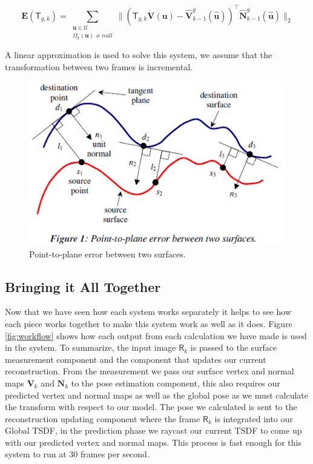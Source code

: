 \documentclass[10pt, twocolumn]{article}
\begin{document}
\begin{equation}
\mathbf{E}(\mathsf{T}_{g,k}) = 
\sum_{\substack{
   \mathbf{u} \in \mathcal{U} \\
   \Omega_{k}(\mathbf{u}) \neq null
  }}
  \| ( \mathsf{T}_{g,k} \mathbf{\dot{V}} (\mathbf{u}) - \mathbf{\hat{V}}^{g}_{k-1} (\mathbf{\hat{u}}))^{\top} \mathbf{\hat{N}}^{g}_{k-1} (\mathbf{\hat{u}}) \|_{2}
\end{equation}


A linear approximation is used to solve this system, we assume that the transformation between two frames is incremental.

\begin{figure}
  \centering
  \includegraphics[width=1.0\linewidth]{pointplane}
  \caption{Point-to-plane error between two surfaces.}
  \label{fig:pointplane}
\end{figure}

\subsection{Bringing it All Together}
Now that we have seen how each system works separately it helps to see how each piece works together to make this system work as well as it does. Figure \ref{fig:workflow} shows how each output from each calculation we have made is used in the system. To summarize, the input image $\mathsf{R}_k$ is passed to the surface measurement component and the component that updates our current reconstruction. From the measurement we pass our surface vertex and normal maps $\mathbf{V}_k$ and $\mathbf{N}_k$ to the pose estimation component, this also requires our predicted vertex and normal maps as well as the global pose as we must calculate the transform with respect to our model. The pose we calculated is sent to the reconstruction updating component where the frame $\mathsf{R}_k$ is integrated into our Global TSDF, in the prediction phase we raycast our current TSDF to come up with our predicted vertex and normal maps. This process is fast enough for this system to run at 30 frames per second. 
\end{document}
